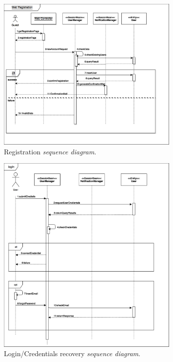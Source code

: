 \documentclass{article}
\begin{document}
	\bigskip
	\begin{figure}[!ht]
	\centering
	\includegraphics[width=0.8\textwidth]{img/diagrams/sd_registration.png}
	\caption{Registration \textit{sequence diagram}.}
	\end{figure}
	\clearpage

	\begin{figure}[!ht]
	\centering
	\includegraphics[width=0.8\textwidth]{img/diagrams/sd_login.png}
	\caption{Login/Credentials recovery \textit{sequence diagram}.}
	\end{figure}
\end{document}
